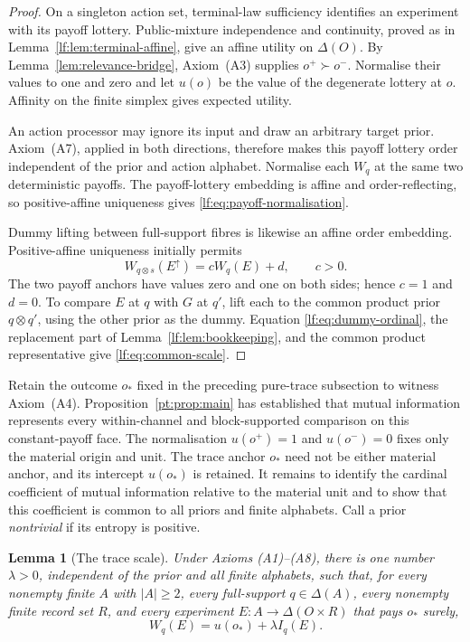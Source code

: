 \documentclass[11pt,a4paper]{article}
\newtheorem{lemma}[theorem]{Lemma}
\theoremstyle{definition}
\newcommand{\D}{\Delta}
\newcommand{\1}{\mathbf 1}
\begin{document}
\begin{proof}
On a singleton action set, terminal-law sufficiency identifies an experiment
with its payoff lottery.  Public-mixture independence and continuity, proved as
in Lemma~\ref{lf:lem:terminal-affine}, give an affine utility on $\D(O)$.
By Lemma~\ref{lem:relevance-bridge}, Axiom~\textup{(A3)} supplies
$o^+\succ o^-$.  Normalise their values to one
and zero and let $u(o)$ be the value of the degenerate lottery at $o$.
Affinity on the finite simplex gives expected utility.

An action processor may ignore its input and draw an arbitrary target prior.
Axiom~\textup{(A7)}, applied in both directions, therefore makes this payoff
lottery order independent of the prior and action alphabet.  Normalise each
$W_q$ at the same two deterministic payoffs.  The payoff-lottery embedding is
affine and order-reflecting, so positive-affine uniqueness gives
\eqref{lf:eq:payoff-normalisation}.

Dummy lifting between full-support fibres is likewise an affine order
embedding.  Positive-affine uniqueness initially permits
\[
W_{q\otimes s}(E^\uparrow)=cW_q(E)+d,
\qquad c>0.
\]
The two payoff anchors have values zero and one on both sides; hence $c=1$ and
$d=0$.  To compare $E$ at $q$ with $G$ at $q'$, lift each to the common product
prior $q\otimes q'$, using the other prior as the dummy.  Equation
\eqref{lf:eq:dummy-ordinal}, the replacement part of
Lemma~\ref{lf:lem:bookkeeping}, and the common product representative give
\eqref{lf:eq:common-scale}.
\end{proof}

Retain the outcome $o_\ast$ fixed in the preceding pure-trace subsection to
witness Axiom~\textup{(A4)}.  Proposition~\ref{pt:prop:main} has established
that mutual information represents every within-channel and block-supported
comparison on this constant-payoff face.
The normalisation $u(o^+)=1$ and $u(o^-)=0$ fixes only the material origin
and unit.  The trace anchor $o_\ast$ need not be either material anchor, and
its intercept $u(o_\ast)$ is retained.  It remains to identify the cardinal
coefficient of mutual information relative to the material unit and to show
that this coefficient is common to all priors and finite alphabets.  Call a
prior \emph{nontrivial} if its entropy is positive.

\begin{lemma}[The trace scale]\label{lf:lem:trace-scale}
Under Axioms \textup{(A1)--(A8)}, there is one number $\lambda>0$, independent
of the prior and all finite alphabets, such that, for every nonempty finite
$A$ with $\lvert A\rvert\ge2$, every full-support $q\in\D(A)$, every nonempty
finite record set $R$, and every experiment
$E:A\to\D(O\times R)$ that pays $o_\ast$ surely,
\begin{equation}
W_q(E)=u(o_\ast)+\lambda I_q(E).
\label{lf:eq:sure-anchor}
\end{equation}
\end{lemma}
\end{document}
